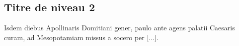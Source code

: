 \subsection{Titre de niveau 2}

Isdem diebus Apollinaris Domitiani gener, paulo ante agens palatii Caesaris curam, ad Mesopotamiam missus a socero per [...].

